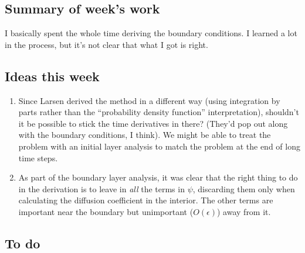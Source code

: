 \documentclass[11pt]{SRJresearch}
\begin{document}
\subsection{Summary of week's work}
I basically spent the whole time deriving the boundary conditions.
I learned a lot in the process, but it's not clear that what I got is right.

\subsection{Ideas this week}
\begin{enumerate}
\item 
  Since Larsen derived the method in a different way (using integration by
  parts rather than the ``probability density function'' interpretation),
  shouldn't it be possible to stick the time derivatives in there? (They'd pop
  out along with the boundary conditions, I think). We might be able to treat
  the problem with an initial layer analysis to match the problem at the end
  of long time steps.

\item
  As part of the boundary layer analysis, it was clear that the right thing to
  do in the derivation is to leave in \emph{all} the terms in $\psi$,
  discarding them only when calculating the diffusion coefficient in the
  interior. The other terms are important near the boundary but unimportant
  ($O(\epsilon)$) away from it.

\end{enumerate}

\subsection{To do}


\end{document}
